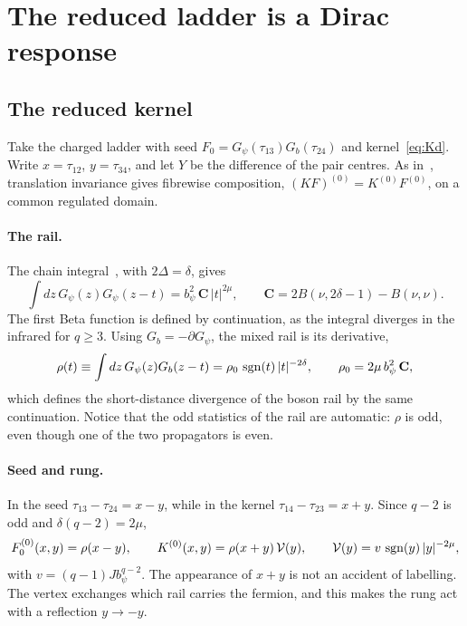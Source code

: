 \section{The reduced ladder is a Dirac response}
\label{sec:dirac}

\subsection{The reduced kernel}

Take the charged ladder with seed $F_0=G_\psi(\tau_{13})G_b(\tau_{24})$ and kernel~\eqref{eq:Kd}. Write $x=\tau_{12}$, $y=\tau_{34}$, and let $Y$ be the difference of the pair centres. As in~\cite{Thong:2026}, translation invariance gives fibrewise composition, $(KF)^{(0)}=K^{(0)}F^{(0)}$, on a common regulated domain.

\paragraph{The rail.} The chain integral~\cite[(C.3)]{Thong:2026}, with $2\Delta=\delta$, gives
\begin{equation}\label{eq:chain}
\int dz\,G_\psi(z)G_\psi(z-t)=b_\psi^2\,\mathbf C\,|t|^{2\mu},\qquad\mathbf C=2B(\nu,2\delta-1)-B(\nu,\nu).
\end{equation}
The first Beta function is defined by continuation, as the integral diverges in the infrared for $q\ge3$. Using $G_b=-\partial G_\psi$, the mixed rail is its derivative,
\begin{equation}\label{eq:rail}
\rho(t)\equiv\int dz\,G_\psi(z)G_b(z-t)=\rho_0\,\operatorname{sgn}(t)\,|t|^{-2\delta},\qquad\rho_0=2\mu\,b_\psi^2\,\mathbf C,
\end{equation}
which defines the short-distance divergence of the boson rail by the same continuation. Notice that the odd statistics of the rail are automatic: $\rho$ is odd, even though one of the two propagators is even.

\paragraph{Seed and rung.} In the seed $\tau_{13}-\tau_{24}=x-y$, while in the kernel $\tau_{14}-\tau_{23}=x+y$. Since $q-2$ is odd and $\delta(q-2)=2\mu$,
\begin{equation}\label{eq:reduced}
F_0^{(0)}(x,y)=\rho(x-y),\qquad K^{(0)}(x,y)=\rho(x+y)\,\mathcal V(y),\qquad\mathcal V(y)=v\,\operatorname{sgn}(y)\,|y|^{-2\mu},
\end{equation}
with $v=(q-1)Jb_\psi^{q-2}$. The appearance of $x+y$ is not an accident of labelling. The vertex exchanges which rail carries the fermion, and this makes the rung act with a reflection $y\to-y$.


